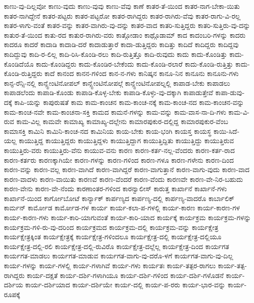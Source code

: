 {ಕಾಣು-ವು-ದಿಲ್ಲವೋ
ಕಾಣು-ವುದು
ಕಾಣು-ವುವು
ಕಾಣು-ವೆವು
ಕಾಣೆ
ಕಾತರ-ತೆ-ಯಿಂದ
ಕಾತರ-ನಾಗ-ಬೇಕಾ-ಯಿತು
ಕಾತರ-ನಾಗಿದ್ದೇನೆ
ಕಾತರ-ಪಟ್ಟರು
ಕಾತರ-ಪಟ್ಟರೋ
ಕಾತರ-ರಾಗಿದ್ದರು
ಕಾತರ-ರಾಗಿರು-ವೆವು
ಕಾತರ-ರಾಗು-ವಿ-ರಲ್ಲ
ಕಾತರ-ಳಾಗು-ವಂತೆ
ಕಾತರ-ವನ್ನು
ಕಾತರ-ವಾಗಿರು-ವು-ದನ್ನು
ಕಾತರ-ವಾದ
ಕಾತರಿ-ಸುತ್ತಿದ್ದರು
ಕಾತರಿ-ಸುತ್ತಿರು-ವು-ದನ್ನು
ಕಾತುರ-ತೆ-ಯಿಂದ
ಕಾತು-ರದ
ಕಾತುರ-ರಾಗಿರು-ವರು
ಕಾತ್ಗೋಡಾಂ
ಕಾಥ್ಗೊಡಾಮ್
ಕಾದ
ಕಾದಂಬರಿ-ಗಳನ್ನು
ಕಾದರು
ಕಾದರೂ
ಕಾದರೆ
ಕಾದಾಡಿ
ಕಾದಾಡಿ-ದರೆ
ಕಾದಾಡುತ್ತಾರೆ
ಕಾದಾ-ಡುತ್ತಿದ್ದರು
ಕಾದಿತ್ತು
ಕಾದಿದೆ
ಕಾದಿದ್ದರು
ಕಾದಿದ್ದವು
ಕಾದಿದ್ದುವು
ಕಾದಿ-ರ-ಲಿಲ್ಲ
ಕಾದಿ-ರಿಸಿ-ಕೊಂಡಿ-ರಲು
ಕಾದಿ-ರುತ್ತಿತ್ತೊ
ಕಾದಿ-ರುವುದು
ಕಾದು
ಕಾದು-ಕೊಂಡಿತ್ತು
ಕಾದು-ಕೊಂಡಿದೆಯೊ
ಕಾದು-ಕೊಂಡಿದ್ದರು
ಕಾದು-ಕೊಂಡಿರ-ಬೇಕೆಂದು
ಕಾದು-ಕೊಂಡಿ-ರಲಾರೆ
ಕಾದು-ಕೊಂಡಿ-ರುತ್ತಿತ್ತು
ಕಾದು-ಕೊಂಡಿ-ರುತ್ತಿದ್ದರು
ಕಾದೆ
ಕಾನಂದ
ಕಾನನ-ಗಳಿಂದ
ಕಾನ-ನ-ಗಳು
ಕಾನಿಷ್ಕನ
ಕಾನೂ-ನಿನ
ಕಾನೂನು
ಕಾನೂನು-ಗಳು
ಕಾನ್ಫ-ರೆನ್ಸಿ-ನಲ್ಲಿ
ಕಾನ್ಸ್ಟೇಂಟಿನೋಪಲ್
ಕಾನ್ಸ್ಟೇಂಟಿನೋಪಲ್ಗೆ
ಕಾನ್ಸ್ಟೇಂಟಿನೋಪಲ್ನಲ್ಲಿ
ಕಾಪಾಡ-ಬೇಕು
ಕಾಪಾಡಲು
ಕಾಪಾಡಲೆಂದು
ಕಾಪಾಡಿ-ಕೊಂಡು
ಕಾಪಾಡಿ-ಕೊಳ್ಳ-ಬೇಕು
ಕಾಪಾಡಿ-ಕೊಳ್ಳು-ವು-ದಕ್ಕಾಗಿ
ಕಾಪಾಡುತ್ತೇವೆ
ಕಾಪಾ-ಡುವು-ದಕ್ಕೆ
ಕಾಪಿ-ಯನ್ನು
ಕಾಪುರುಷತೆ
ಕಾಮ
ಕಾಮ-ಕಾಂಚನ
ಕಾಮ-ಕಾಂಚ-ನಕ್ಕೆ
ಕಾಮ-ಕಾಂಚ-ನದ
ಕಾಮ-ಕಾಂಚನ-ವನ್ನು
ಕಾಮ-ಕಾಂಚ-ನವೇ
ಕಾಮ-ಕಾಂಚನಾ-ಸಕ್ತಿ
ಕಾಮದ
ಕಾಮನೆ-ಗಳನ್ನು
ಕಾಮ-ವನ್ನು
ಕಾಮ-ವಾಸ-ನಾ-ದಿ-ಗಳು
ಕಾಮ-ವಿ-ರುವ
ಕಾಮ-ವಿಲ್ಲ
ಕಾಮವೇ
ಕಾಮಾಖ್ಯ
ಕಾಮಾಖ್ಯ-ದಲ್ಲೇನು
ಕಾಮಾರಪುಕುರ-ದಲ್ಲಿದ್ದ
ಕಾಮಾರಪುಕುರ-ವೆಂಬ
ಕಾಮಾಸಕ್ತಿ
ಕಾಮಿನಿ
ಕಾಮಿನಿ-ಕಾಂಚ-ನದ
ಕಾಮಿನಿಯ
ಕಾಯ-ಬೇಕು
ಕಾಯ-ಭಂಗಿ
ಕಾಯಸ್ತ
ಕಾಯಸ್ಥ
ಕಾಯಿ-ಸಿದೆ-ಯಲ್ಲ
ಕಾಯುತ್ತಿದ್ದ
ಕಾಯುತ್ತಿದ್ದರು
ಕಾಯುತ್ತಿದ್ದಳು
ಕಾಯುತ್ತಿದ್ದಾಗ
ಕಾಯುತ್ತಿದ್ದಿತು
ಕಾಯುತ್ತಿದ್ದು
ಕಾಯುತ್ತಿರುವ
ಕಾಯುತ್ತಿರು-ವರು
ಕಾಯುತ್ತಿರು-ವೆನು
ಕಾಯುವ-ವನು
ಕಾರಣ
ಕಾರಣ-ಕರ್ತ-ನಲ್ಲ-ವೆಂದರು
ಕಾರಣ-ಕರ್ತ-ರಾದ
ಕಾರಣ-ಕರ್ತರು
ಕಾರಣಕ್ಕಾಗಿಯೇ
ಕಾರಣ-ಗಳನ್ನು
ಕಾರಣ-ಗಳಿಂದ
ಕಾರಣ-ಗಳೂ
ಕಾರಣ-ಗಳೇನು
ಕಾರಣ-ದಿಂದ
ಕಾರಣ-ವನ್ನು
ಕಾರಣ-ವಲ್ಲ
ಕಾರಣ-ವಾಗಿದೆ
ಕಾರಣ-ವಾಗಿದ್ದರೆ
ಕಾರಣ-ವಾಗುತ್ತಾನೆ
ಕಾರಣ-ವಾಗು-ವುದು
ಕಾರಣ-ವಾದ
ಕಾರಣ-ವಾದಳು
ಕಾರಣ-ವಾಯಿತು
ಕಾರಣವೆ
ಕಾರಣ-ವೆಂದರೆ
ಕಾರಣ-ವೆಂದು
ಕಾರಣವೇ
ಕಾರಣ-ವೇ-ನಿರ-ಬಹುದು
ಕಾರಣ-ವೇನು
ಕಾರಣ-ವೇ-ನೆಂದು
ಕಾರಣಾಂತರ-ಗಳಿಂದ
ಕಾರನ್ವಾಲೀಸ್
ಕಾರುತ್ತ
ಕಾರ್ಖಾನೆ
ಕಾರ್ಖಾನೆ-ಗಳು
ಕಾರ್ಖಾನೆ-ಯಿಂದ
ಕಾರ್ಗೋಬೋಟೆ
ಕಾರ್ನ್ಯಾಕ್
ಕಾರ್ಪಣ್ಯದ
ಕಾರ್ಪಣ್ಯ-ದಲ್ಲಿ
ಕಾರ್ಪಣ್ಯ-ವಾದರೊ
ಕಾರ್ಬಾಲಿಕ್
ಕಾರ್ಮನ್
ಕಾರ್ಮೋಡ
ಕಾರ್ಮೋಡ-ಗಳ
ಕಾರ್ಯ
ಕಾರ್ಯ-ಕಲಾ-ಪ-ಗಳಲ್ಲಿ
ಕಾರ್ಯ-ಕಾರಣ
ಕಾರ್ಯ-ಕಾರಣ-ಗಳ
ಕಾರ್ಯ-ಕಾರಣ-ಗಳು
ಕಾರ್ಯ-ಕಾರಿ-ಯಾಗುವಂತೆ
ಕಾರ್ಯ-ಕಾರಿ-ಯಾದ
ಕಾರ್ಯಕ್ಕೆ
ಕಾರ್ಯಕ್ರಮ
ಕಾರ್ಯಕ್ರಮ-ಗಳನ್ನು
ಕಾರ್ಯಕ್ರಮ-ಗಳಿ-ರು-ವು-ದರಿಂದ
ಕಾರ್ಯಕ್ರಮದ
ಕಾರ್ಯಕ್ರಮ-ದಲ್ಲಿ
ಕಾರ್ಯಕ್ರಮ-ವನ್ನು
ಕಾರ್ಯಕ್ಷೇತ್ರ
ಕಾರ್ಯಕ್ಷೇತ್ರಕ್ಕಿಂತ
ಕಾರ್ಯಕ್ಷೇತ್ರಕ್ಕೆ
ಕಾರ್ಯಕ್ಷೇತ್ರ-ಗಳಿಂದಲೂ
ಕಾರ್ಯಕ್ಷೇತ್ರ-ದಲ್ಲಿ
ಕಾರ್ಯಕ್ಷೇತ್ರ-ದಲ್ಲಿಯೂ
ಕಾರ್ಯಕ್ಷೇತ್ರ-ದಲ್ಲಿ-ರಲಿ
ಕಾರ್ಯಕ್ಷೇತ್ರ-ದಲ್ಲಿ-ರುವಿರೊ
ಕಾರ್ಯಕ್ಷೇತ್ರ-ದಲ್ಲೆಲ್ಲ
ಕಾರ್ಯಕ್ಷೇತ್ರ-ದಿಂದ
ಕಾರ್ಯಗತ
ಕಾರ್ಯಗತ-ಮಾಡಲು
ಕಾರ್ಯಗತ-ಮಾಡುವ
ಕಾರ್ಯಗತ-ವಾಗು-ವು-ದರೊ-ಳಗೆ
ಕಾರ್ಯಗತ-ವಾಗು-ವು-ದಿಲ್ಲ
ಕಾರ್ಯ-ಗಳನ್ನು
ಕಾರ್ಯ-ಗಳಲ್ಲಿ
ಕಾರ್ಯ-ಗಳಾಗಿವೆ
ಕಾರ್ಯ-ಗಳು
ಕಾರ್ಯತಃ
ಕಾರ್ಯ-ತತ್ಪರ-ರಾಗಲು
ಕಾರ್ಯ-ತತ್ಪ-ರಾಗಿದ್ದರು
ಕಾರ್ಯ-ದಕ್ಷತೆ
ಕಾರ್ಯ-ದರ್ಶಿ-ಗಳಾಗಿಯೂ
ಕಾರ್ಯ-ದರ್ಶಿ-ಗಳಿಂದ
ಕಾರ್ಯ-ದರ್ಶಿ-ಗಳೊಡನೆ
ಕಾರ್ಯ-ದರ್ಶಿಯ
ಕಾರ್ಯ-ದರ್ಶಿಯಾದ
ಕಾರ್ಯ-ದರ್ಶಿಯೇ
ಕಾರ್ಯ-ದಲ್ಲಿ
ಕಾರ್ಯ-ಪ-ರರು
ಕಾರ್ಯ-ಭಾರ-ವನ್ನು
ಕಾರ್ಯ-ರೂಪಕ್ಕೆ
}
